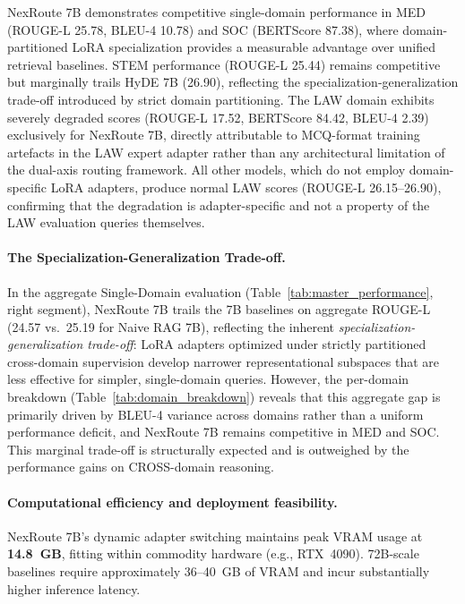 \documentclass[a4paper,fleql]{cas-sc}
\begin{document}
\vspace{6pt plus 4pt minus 3pt}
NexRoute 7B demonstrates competitive single-domain performance in MED
(ROUGE-L 25.78, BLEU-4 10.78) and SOC (BERTScore 87.38), where
domain-partitioned LoRA specialization provides a measurable advantage over
unified retrieval baselines. STEM performance (ROUGE-L 25.44) remains
competitive but marginally trails HyDE 7B (26.90), reflecting the
specialization-generalization trade-off introduced by strict domain
partitioning. The LAW domain exhibits severely degraded scores (ROUGE-L 17.52,
BERTScore 84.42, BLEU-4 2.39) exclusively for NexRoute 7B, directly
attributable to MCQ-format training artefacts in the LAW expert adapter rather
than any architectural limitation of the dual-axis routing framework. All other
models, which do not employ domain-specific LoRA adapters, produce normal LAW
scores (ROUGE-L 26.15--26.90), confirming that the degradation is adapter-specific
and not a property of the LAW evaluation queries themselves.

\paragraph{The Specialization-Generalization Trade-off.}
In the aggregate Single-Domain evaluation
(Table~\ref{tab:master_performance}, right segment), NexRoute 7B trails the
7B baselines on aggregate ROUGE-L (24.57 vs.\ 25.19 for Naive RAG 7B),
reflecting the inherent \emph{specialization-generalization trade-off}: LoRA
adapters optimized under strictly partitioned cross-domain supervision develop
narrower representational subspaces that are less effective for simpler,
single-domain queries. However, the per-domain breakdown
(Table~\ref{tab:domain_breakdown}) reveals that this aggregate gap is
primarily driven by BLEU-4 variance across domains rather than a uniform
performance deficit, and NexRoute 7B remains competitive in MED and SOC.
This marginal trade-off is structurally expected and is outweighed by the
performance gains on CROSS-domain reasoning.

\paragraph{Computational efficiency and deployment feasibility.}
NexRoute 7B's dynamic adapter switching maintains peak VRAM usage at
\textbf{14.8~GB}, fitting within commodity hardware (e.g., RTX~4090).
72B-scale baselines require approximately 36--40~GB of VRAM and incur
substantially higher inference latency.
\end{document}
